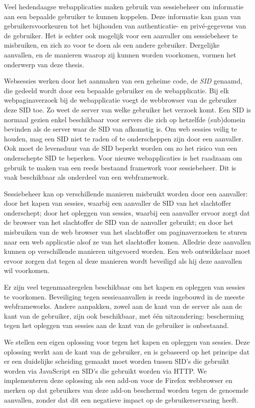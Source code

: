 \documentclass[master=cws,english]{kulemt}
\begin{document}
\begin{abstract*}
Veel hedendaagse webapplicaties maken gebruik van sessiebeheer om informatie aan een bepaalde gebruiker te kunnen koppelen. Deze informatie kan gaan van gebruikersvoorkeuren tot het bijhouden van authenticatie- en priv\'e-gegevens van de gebruiker. Het is echter ook mogelijk voor een aanvaller om sessiebeheer te misbruiken, en zich zo voor te doen als een andere gebruiker. Dergelijke aanvallen, en de manieren waarop zij kunnen worden voorkomen, vormen het onderwerp van deze thesis.

Websessies werken door het aanmaken van een geheime code, de \emph{SID} genaamd, die gedeeld wordt door een bepaalde gebruiker en de webapplicatie. Bij elk webpaginaverzoek bij de webapplicatie voegt de webbrowser van de gebruiker deze SID toe. Zo weet de server van welke gebruiker het verzoek komt. Een SID is normaal gezien enkel beschikbaar voor servers die zich op hetzelfde (sub)domein bevinden als de server waar de SID van afkomstig is. Om web sessies veilig te houden, mag een SID niet te raden of te onderscheppen zijn door een aanvaller. Ook moet de levensduur van de SID beperkt worden om zo het risico van een onderschepte SID te beperken. Voor nieuwe webapplicaties is het raadzaam om gebruik te maken van een reeds bestaand framework voor sessiebeheer. Dit is vaak beschikbaar als onderdeel van een webframework.

Sessiebeheer kan op verschillende manieren misbruikt worden door een aanvaller: door het kapen van sessies, waarbij een aanvaller de SID van het slachtoffer onderschept; door het opleggen van sessies, waarbij een aanvaller ervoor zorgt dat de browser van het slachtoffer de SID van de aanvaller gebruikt; en door het misbruiken van de web browser van het slachtoffer om paginaverzoeken te sturen naar een web applicatie alsof ze van het slachtoffer komen. Alledrie deze aanvallen kunnen op verschillende manieren uitgevoerd worden. Een web ontwikkelaar moet ervoor zorgen dat tegen al deze manieren wordt beveiligd als hij deze aanvallen wil voorkomen.

Er zijn veel tegenmaatregelen beschikbaar om het kapen en opleggen van sessies te voorkomen. Beveiliging tegen sessieaanvallen is reeds ingebouwd in de meeste webframeworks. Andere aanpakken, zowel aan de kant van de server als aan de kant van de gebruiker, zijn ook beschikbaar, met \'e\'en uitzondering: bescherming tegen het opleggen van sessies aan de kant van de gebruiker is onbestaand.

We stellen een eigen oplossing voor tegen het kapen en opleggen van sessies. Deze oplossing werkt aan de kant van de gebruiker, en is gebaseerd op het principe dat er een duidelijke scheiding gemaakt moet worden tussen SID's die gebruikt worden via JavaScript en SID's die gebruikt worden via HTTP. We implementeren deze oplossing als een add-on voor de Firefox webbrowser en merken op dat gebruikers van deze add-on beschermd worden tegen de genoemde aanvallen, zonder dat dit een negatieve impact op de gebruikerservaring heeft.
\end{abstract*}
\end{document}
